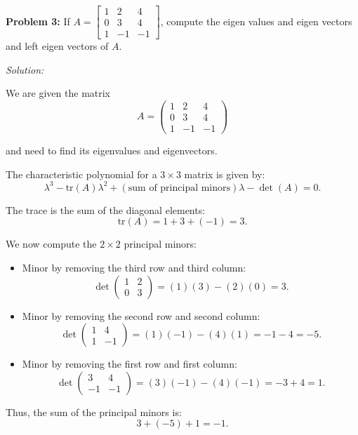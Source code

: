 \documentclass[
  letterpaper,
  DIV=11,
  numbers=noendperiod]{scrreprt}
\theoremstyle{plain}
\theoremstyle{definition}
\theoremstyle{remark}
\begin{document}
\textbf{Problem 3:} If
\(A=\begin{bmatrix}1&2&4\\ 0&3&4\\ 1&-1&-1 \end{bmatrix}\), compute the
eigen values and eigen vectors and left eigen vectors of \(A\).

\emph{Solution:}

We are given the matrix \[
A = \begin{pmatrix} 1 & 2 & 4 \\ 0 & 3 & 4 \\ 1 & -1 & -1 \end{pmatrix}
\]

and need to find its eigenvalues and eigenvectors.

The characteristic polynomial for a \(3 \times 3\) matrix is given by:
\[
\lambda^3 - \text{tr}(A)\lambda^2 + (\text{sum of principal minors})\lambda - \det(A) = 0.
\]

The trace is the sum of the diagonal elements: \[
\text{tr}(A) = 1 + 3 + (-1) = 3.
\]

We now compute the \(2 \times 2\) principal minors:

\begin{itemize}
\item
  Minor by removing the third row and third column: \[
  \det\begin{pmatrix} 1 & 2 \\ 0 & 3 \end{pmatrix} = (1)(3) - (2)(0) = 3.
  \]
\item
  Minor by removing the second row and second column: \[
  \det\begin{pmatrix} 1 & 4 \\ 1 & -1 \end{pmatrix} = (1)(-1) - (4)(1) = -1 - 4 = -5.
  \]
\item
  Minor by removing the first row and first column: \[
  \det\begin{pmatrix} 3 & 4 \\ -1 & -1 \end{pmatrix} = (3)(-1) - (4)(-1) = -3 + 4 = 1.
  \]
\end{itemize}

Thus, the sum of the principal minors is: \[
3 + (-5) + 1 = -1.
\]
\end{document}
